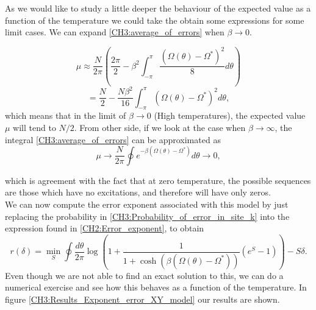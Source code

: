 As we would like to study a little deeper the behaviour of the expected value as a function of the temperature we could take the obtain some expressions for some limit cases.
We can expand \eqref{CH3:average_of_errors} when $\beta\to 0$.

\begin{equation*}
    \mu \approx \frac{N}{2\pi}\left(\frac{2\pi}{2}-\beta^2\int_{-\pi}^{\pi}\frac{(\Omega(\theta)-\Omega^{*})^2}{8}d\theta\right)
\end{equation*}
\begin{equation}
    =\frac{N}{2}-\frac{N\beta^2}{16}\int_{-\pi}^{\pi}(\Omega(\theta)-\Omega^{*})^2d\theta,
    \label{CH3:beta_to_0}
\end{equation}
which means that in the limit of $\beta\to 0$ (High temperatures), the expected value $\mu$ will tend to $N/2$. From other side, if we look at the case when $\beta\to \infty$, the integral \eqref{CH3:average_of_errors} can be approximated as
\begin{equation}
    \mu \to \frac{N}{2\pi}\oint e^{-\beta(\Omega(\theta)-\Omega^{*})}d\theta\to 0,
    \label{CH3:beta_to_infty}
\end{equation}

which is agreement with the fact that at zero temperature, the possible sequences are those which have no excitations, and therefore will have only zeros.\\
We can now compute the error exponent associated with this model by just replacing the probability in \eqref{CH3:Probability_of_error_in_site_k} into the expression found in \eqref{CH2:Error_exponent}, to obtain
\begin{equation}
r(\delta) = \min_{S}\oint \frac{d\theta}{2\pi}\log\left(1+\frac{1}{1+\cosh\left(\beta(\Omega(\theta)-\Omega^*)\right)}(e^S-1)\right)-S\delta.
\label{CH3:Error_exponent_for_xy_model}
\end{equation}
Even though we are not able to find an exact solution to this, we can do a numerical exercise and see how this behaves as a function of the temperature. In figure \ref{CH3:Results_Exponent_error_XY_model} our results are shown.

